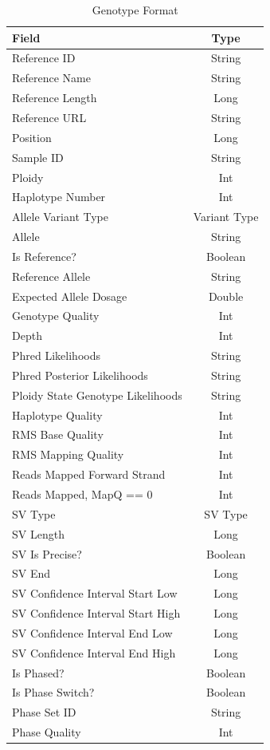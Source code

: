 \documentclass[10pt,twocolumn]{article}
\theoremstyle{plain}
\begin{document}
\begin{table}
\caption{Genotype Format}
\label{tab:genotype-format}
\begin{center}
\begin{tabular}{| l | c |}
\hline
\bf Field & \bf Type \\
\hline
Reference ID & String \\
Reference Name & String \\
Reference Length & Long \\
Reference URL & String \\
Position & Long \\
Sample ID & String \\
Ploidy & Int \\
Haplotype Number & Int \\
Allele Variant Type & Variant Type \\
Allele & String \\
Is Reference? & Boolean \\
Reference Allele & String \\
Expected Allele Dosage & Double \\
Genotype Quality & Int \\
Depth & Int \\
Phred Likelihoods & String \\
Phred Posterior Likelihoods & String \\
Ploidy State Genotype Likelihoods & String \\
Haplotype Quality & Int \\
RMS Base Quality & Int \\
RMS Mapping Quality & Int \\
Reads Mapped Forward Strand & Int \\
Reads Mapped, MapQ == 0 & Int \\
SV Type & SV Type \\
SV Length & Long \\
SV Is Precise? & Boolean \\
SV End & Long \\
SV Confidence Interval Start Low & Long \\ 
SV Confidence Interval Start High & Long \\
SV Confidence Interval End Low & Long \\ 
SV Confidence Interval End High & Long \\
Is Phased? & Boolean \\
Is Phase Switch? & Boolean \\
Phase Set ID & String \\
Phase Quality & Int \\
\hline
\end{tabular}
\end{center}
\end{table}
\end{document}
